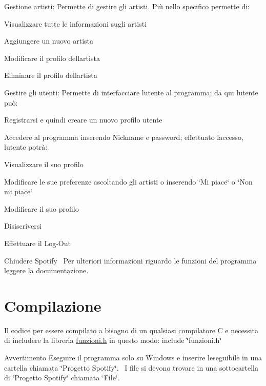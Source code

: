 \begin{DoxyEnumerate}
\item Gestione artisti\+: Permette di gestire gli artisti. Più nello specifico permette di\+:
\begin{DoxyEnumerate}
\item Visualizzare tutte le informazioni sugli artisti
\item Aggiungere un nuovo artista
\item Modificare il profilo dell\textquotesingle{}artista
\item Eliminare il profilo dell\textquotesingle{}artista
\end{DoxyEnumerate}
\item Gestire gli utenti\+: Permette di interfacciare l\textquotesingle{}utente al programma; da qui l\textquotesingle{}utente può\+:
\begin{DoxyEnumerate}
\item Registrarsi e quindi creare un nuovo profilo utente
\item Accedere al programma inserendo Nickname e password; effettuato l\textquotesingle{}accesso, l\textquotesingle{}utente potrà\+:
\begin{DoxyEnumerate}
\item Visualizzare il suo profilo
\item Modificare le sue preferenze ascoltando gli artisti o inserendo \char`\"{}\+Mi piace\char`\"{} o \char`\"{}\+Non mi piace\char`\"{}
\item Modificare il suo profilo
\item Disiscriversi
\item Effettuare il Log-\/\+Out
\end{DoxyEnumerate}
\end{DoxyEnumerate}
\item Chiudere Spotify~\newline
 Per ulteriori informazioni riguardo le funzioni del programma leggere la documentazione.
\end{DoxyEnumerate}\hypertarget{index_comp_sec}{}\section{Compilazione}\label{index_comp_sec}
Il codice per essere compilato a bisogno di un qualsiasi compilatore C e necessita di includere la libreria \hyperlink{funzioni_8h}{funzioni.\+h} in questo modo\+: include \char`\"{}funzioni.\+h\char`\"{} \begin{DoxyWarning}{Avvertimento}
Eseguire il programma solo su Windows e inserire l\textquotesingle{}eseguibile in una cartella chiamata \char`\"{}\+Progetto Spotify\char`\"{}.~\newline
 I file si devono trovare in una sottocartella di \char`\"{}\+Progetto Spotify\char`\"{} chiamata \char`\"{}\+File\char`\"{}. 
\end{DoxyWarning}
